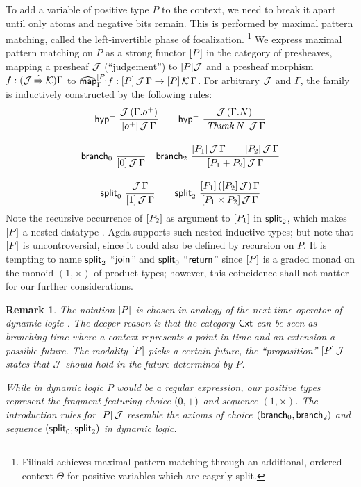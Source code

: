 \documentclass[sigconf,screen,fleqn]{acmart} %
\newtheorem{remark}{Remark}
\begin{document}
To add a variable of positive type $P$ to the context, we need to
break it apart until only atoms and negative bits remain.  This is
performed by maximal pattern matching, called the left-invertible
phase of focalization.%
\footnote{Filinski \cite[Section~4]{filinski:tlca01} achieves maximal pattern
matching through an additional, ordered context $\Theta$ for positive
variables which are eagerly split.}
We express maximal pattern matching on $P$ as a strong functor
$[P]$ in the category of presheaves,
mapping a presheaf $\mathcal{J}$ (``judgement'') to $[P] \mathcal{J}$
and a presheaf morphism $f : (\J \hatto \K)\Gamma$ to
$\widehat{\mathsf{map}}^{[P]}_\Gamma f : [P]\,\mathcal{J}\,\Gamma \to [P]\,\mathcal{K}\,\Gamma$.
For arbitrary $\mathcal{J}$ and $\Gamma$, the family  is
inductively constructed by the following rules:
\begin{gather*}
  \nru{\phyp}
      {\J\,(\cext \Gamma \patom)}
      {\AddHyp {\patom} \J \Gamma}
\qquad
  \nru{\nhyp}
      {\J\,(\cext \Gamma N)}
      {\AddHyp {\Thunk N} \J \Gamma}
\\[2ex]
  \nru{\nbranch}
      {}
      {\AddHyp {\tyzero} \J \Gamma}
\quad
  \nru{\bbranch}
      {\AddHyp {P_1} \J \Gamma \qquad
       \AddHyp {P_2} \J \Gamma }
      {\AddHyp {P_1 + P_2} \J \Gamma}
\\[2ex]
  \nru{\nsplit}
      {\J\,\Gamma}
      {\AddHyp {\tyone} \J \Gamma}
\qquad
  \nru{\bsplit}
      {\AddHyp {P_1} {\left(\Add{P_2}\,\J\right)} \Gamma}
      {\AddHyp {P_1 \times P_2} \J \Gamma}
\end{gather*}
Note the recursive occurrence of $[P_2]$ as argument to
$[P_1]$ in $\mathsf{split}_2$, which makes $[P]$ a nested datatype
\cite{bird:nested}.  Agda supports such nested inductive types; but
note that $[P]$ is uncontroversial, since it could also be defined
by recursion on $P$.   It is tempting to name $\mathsf{split}_2$
``$\mathsf{join}^{}$'' and $\mathsf{split}_0$ ``$\mathsf{return}^{}$''
since $[P]$ is a graded monad on the monoid $(1,\times)$
of product types;
however, this coincidence shall not matter for our further considerations.

\begin{remark}
The notation $[P]$ is chosen in analogy of the next-time operator
of dynamic logic \citep{pratt:focs76}.
The deeper reason is that the category $\mathsf{Cxt}$ can be seen as
branching time where a context represents a point in time and an
extension a possible future.  The modality $[P]$ picks a certain
future, the ``proposition'' $[P]\,\mathcal{J}$ states that
$\mathcal{J}$ should hold in the future determined by $P$.

While in dynamic logic $P$ would be a regular expression, our positive
types represent the fragment featuring choice $(0, +)$ and
sequence $(1, \times)$.  The introduction rules for $[P]\,\mathcal{J}$
resemble the axioms of choice $(\mathsf{branch}_0, \mathsf{branch}_2)$
and sequence $(\mathsf{split}_0,\mathsf{split}_2)$ in dynamic logic.
\end{remark}
\end{document}

